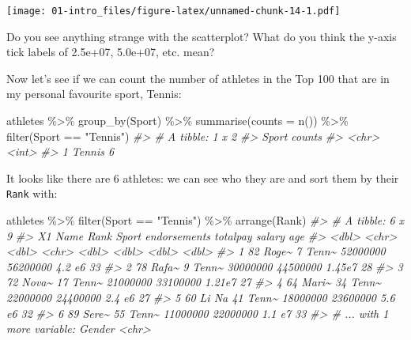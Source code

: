 \documentclass[
]{book}
\newenvironment{Shaded}{\begin{snugshade}}{\end{snugshade}}
\newcommand{\AttributeTok}[1]{\textcolor[rgb]{0.77,0.63,0.00}{#1}}
\newcommand{\CommentTok}[1]{\textcolor[rgb]{0.56,0.35,0.01}{\textit{#1}}}
\newcommand{\FunctionTok}[1]{\textcolor[rgb]{0.00,0.00,0.00}{#1}}
\newcommand{\NormalTok}[1]{#1}
\newcommand{\SpecialCharTok}[1]{\textcolor[rgb]{0.00,0.00,0.00}{#1}}
\newcommand{\StringTok}[1]{\textcolor[rgb]{0.31,0.60,0.02}{#1}}
\begin{document}
\texttt{[image: 01-intro\_files/figure-latex/unnamed-chunk-14-1.pdf]}

Do you see anything strange with the scatterplot? What do you think the y-axis tick labels of 2.5e+07, 5.0e+07, etc. mean?

Now let's see if we can count the number of athletes in the Top 100 that are in my personal favourite sport, Tennis:

\begin{Shaded}
\begin{Highlighting}[]
\NormalTok{athletes }\SpecialCharTok{\%\textgreater{}\%} \FunctionTok{group\_by}\NormalTok{(Sport) }\SpecialCharTok{\%\textgreater{}\%}
  \FunctionTok{summarise}\NormalTok{(}\AttributeTok{counts =} \FunctionTok{n}\NormalTok{()) }\SpecialCharTok{\%\textgreater{}\%}
  \FunctionTok{filter}\NormalTok{(Sport }\SpecialCharTok{==} \StringTok{"Tennis"}\NormalTok{)}
\CommentTok{\#\textgreater{} \# A tibble: 1 x 2}
\CommentTok{\#\textgreater{}   Sport  counts}
\CommentTok{\#\textgreater{}   \textless{}chr\textgreater{}   \textless{}int\textgreater{}}
\CommentTok{\#\textgreater{} 1 Tennis      6}
\end{Highlighting}
\end{Shaded}

It looks like there are 6 athletes: we can see who they are and sort them by their \texttt{Rank} with:

\begin{Shaded}
\begin{Highlighting}[]
\NormalTok{athletes }\SpecialCharTok{\%\textgreater{}\%}
  \FunctionTok{filter}\NormalTok{(Sport }\SpecialCharTok{==} \StringTok{"Tennis"}\NormalTok{) }\SpecialCharTok{\%\textgreater{}\%}
  \FunctionTok{arrange}\NormalTok{(Rank)}
\CommentTok{\#\textgreater{} \# A tibble: 6 x 9}
\CommentTok{\#\textgreater{}      X1 Name   Rank Sport endorsements totalpay salary   age}
\CommentTok{\#\textgreater{}   \textless{}dbl\textgreater{} \textless{}chr\textgreater{} \textless{}dbl\textgreater{} \textless{}chr\textgreater{}        \textless{}dbl\textgreater{}    \textless{}dbl\textgreater{}  \textless{}dbl\textgreater{} \textless{}dbl\textgreater{}}
\CommentTok{\#\textgreater{} 1    82 Roge\textasciitilde{}     7 Tenn\textasciitilde{}     52000000 56200000 4.2 e6    33}
\CommentTok{\#\textgreater{} 2    78 Rafa\textasciitilde{}     9 Tenn\textasciitilde{}     30000000 44500000 1.45e7    28}
\CommentTok{\#\textgreater{} 3    72 Nova\textasciitilde{}    17 Tenn\textasciitilde{}     21000000 33100000 1.21e7    27}
\CommentTok{\#\textgreater{} 4    64 Mari\textasciitilde{}    34 Tenn\textasciitilde{}     22000000 24400000 2.4 e6    27}
\CommentTok{\#\textgreater{} 5    60 Li Na    41 Tenn\textasciitilde{}     18000000 23600000 5.6 e6    32}
\CommentTok{\#\textgreater{} 6    89 Sere\textasciitilde{}    55 Tenn\textasciitilde{}     11000000 22000000 1.1 e7    33}
\CommentTok{\#\textgreater{} \# ... with 1 more variable: Gender \textless{}chr\textgreater{}}
\end{Highlighting}
\end{Shaded}
\end{document}
